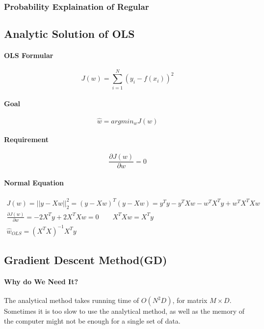 \documentclass{article}
\begin{document}
	\subsubsection{Probability Explaination of Regular}
	\subsection{Analytic Solution of OLS}
	\paragraph{OLS Formular}
	\begin{displaymath}
		J(w) = \sum_{i=1}^{N}(y_i - f(x_i))^2
	\end{displaymath}
	\paragraph{Goal}
	\begin{displaymath}
		\hat{w} = argmin_w J(w)
	\end{displaymath}
	\paragraph{Requirement}
	\begin{displaymath}
		\frac{\partial J(w)}{\partial w} = 0
	\end{displaymath}
	\paragraph{Normal Equation}
	\begin{gather*}
	J(w) = ||y - Xw||^2_2 = (y - Xw)^T(y - Xw) = y^Ty - y^TXw - w^TX^Ty + w^TX^TXw\\
	\frac{\partial J(w)}{\partial w} = -2X^Ty + 2X^TXw = 0 \qquad X^TXw = X^Ty\\
	\hat{w}_{OLS} = (X^TX)^{-1}X^Ty
	\end{gather*}
	\subsection{Gradient Descent Method(GD)}
	\paragraph{Why do We Need It?}
	The analytical method takes running time of $O(N^2D)$, for matrix $M\times D$. Sometimes it is too slow to use the analytical method, as well as the memory of the computer might not be enough for a single set of data.
\end{document}
